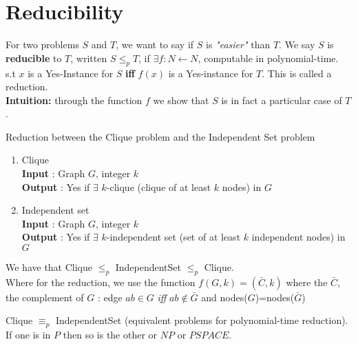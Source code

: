 \section{Reducibility}
For two problems $S$ and $T$, we want to say if $S$ is \textit{"easier"} than $T$.
We say $S$ is \textbf{reducible} to $T$, written $S \leq_p T$, 
if $\exists f:N\leftarrow N$, computable in polynomial-time. \\
s.t $x$ is a Yes-Instance for $S$ \textbf{iff} $f(x)$ is a Yes-instance for $T$.
This is called a reduction.\\
\textbf{Intuition:} through the function $f$ we show that $S$ is in fact a particular case of $T$.\\

\begin{leftbar}
\begin{example} Reduction between the Clique problem and the Independent Set problem
\begin{enumerate}
	\item Clique\\
\textbf{Input} : Graph $G$, integer $k$\\
\textbf{Output} : Yes if $\exists$ $k$-clique (clique of at least $k$ nodes) in $G$
\item Independent set\\
\textbf{Input} : Graph $G$, integer $k$\\
\textbf{Output} : Yes if $\exists$ $k$-independent set (set of at least $k$ independent nodes) in $G$
\end{enumerate}

We have that Clique $\leq_p$ IndependentSet $\leq_p$ Clique.\\
Where for the reduction, we use the function $f(G,k) = (\bar{C}, k)$ where the $\bar{C}$, the complement of $G$ : edge $ab \in G$ \emph{iff} $ab\notin \bar{G}$ and nodes($G$)=nodes($\bar{G}$)
\end{example}
\end{leftbar}

\begin{remark} Clique $\equiv_p$ IndependentSet (equivalent problems for polynomial-time reduction). If one is in $P$ then so is the other or $NP$ or $PSPACE$.
\end{remark}
